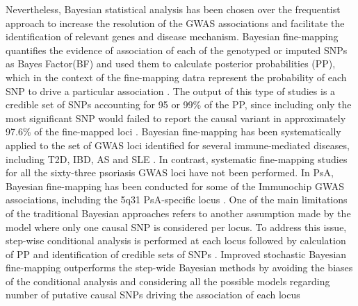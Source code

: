 Nevertheless, Bayesian statistical analysis has been chosen over the frequentist approach to increase the resolution of the GWAS associations and facilitate the identification of relevant genes and disease mechanism. Bayesian fine-mapping quantifies the evidence of association of each of the genotyped or imputed SNPs as Bayes Factor(BF) and used them to calculate posterior probabilities (PP), which in the context of the fine-mapping datra represent the probability of each SNP to drive a particular association \parencite{Wakefield2007}. The output of this type of studies is a credible set of SNPs accounting for 95 or 99\% of the PP, since including only the most significant SNP would failed to report the causal variant in approximately 97.6\% of the fine-mapped loci \parencite{Bunt2015}. Bayesian fine-mapping has been systematically applied to the set of GWAS loci identified for several immune-mediated diseases, including T2D, IBD, AS and SLE \parencite{Maller2012,Gaulton2015,Bunt2015,Sun2016,Huang2017}. In contrast, systematic fine-mapping studies for all the sixty-three psoriasis GWAS loci have not been performed. In PsA, Bayesian fine-mapping has been conducted for some of the Immunochip GWAS associations, including the 5q31 PsA-specific locus  \parencite{Bowes2015}. One of the main limitations of the traditional Bayesian approaches refers to another assumption made by the model where only one causal SNP is considered per locus. To address this issue, step-wise conditional analysis is performed at each locus followed by calculation of PP and identification of credible sets of SNPs  . Improved stochastic Bayesian fine-mapping outperforms the step-wide Bayesian methods by avoiding the biases of the conditional analysis and considering all the possible models regarding number of putative causal SNPs driving the association of each locus \parencite{Wallace2016}

